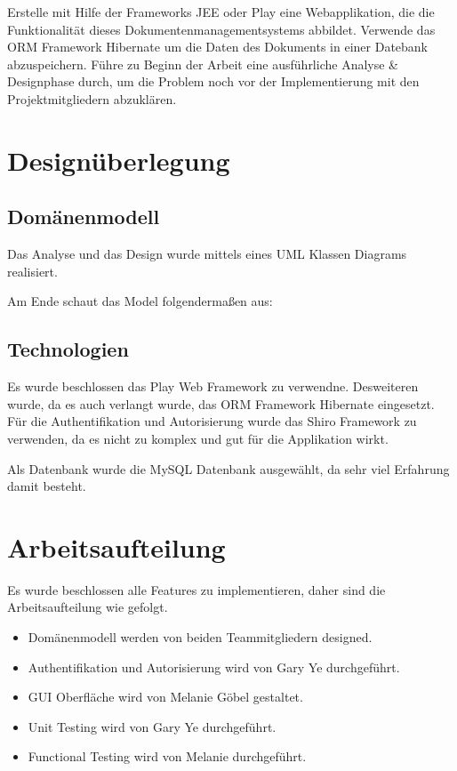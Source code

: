 \documentclass[11pt, a4paper]{article}
\begin{document}
Erstelle mit Hilfe der Frameworks JEE oder Play eine Webapplikation, die die Funktionalität dieses Dokumentenmanagementsystems abbildet. Verwende das ORM Framework Hibernate um die Daten des Dokuments in einer Datebank abzuspeichern. Führe zu Beginn der Arbeit eine ausführliche Analyse \& Designphase durch, um die Problem noch vor der Implementierung mit den Projektmitgliedern abzuklären.

\section{Designüberlegung}


\subsection{Domänenmodell}
Das Analyse und das Design wurde mittels eines UML Klassen Diagrams realisiert.



Am Ende schaut das Model folgendermaßen aus:

\subsection{Technologien}

Es wurde beschlossen das Play Web Framework zu verwendne. Desweiteren wurde, da es auch verlangt wurde, das ORM Framework Hibernate eingesetzt. Für die Authentifikation und Autorisierung wurde das Shiro Framework zu verwenden, da es nicht zu komplex und gut für die Applikation wirkt. 

Als Datenbank wurde die MySQL Datenbank ausgewählt, da sehr viel Erfahrung damit besteht.

\section{Arbeitsaufteilung}

Es wurde beschlossen alle Features zu implementieren, daher sind die Arbeitsaufteilung wie gefolgt. 

\begin{itemize}
  \item Domänenmodell werden von beiden Teammitgliedern designed.
  \item Authentifikation und Autorisierung wird von Gary Ye durchgeführt.
  \item GUI Oberfläche wird von Melanie Göbel gestaltet.
  \item Unit Testing wird von Gary Ye durchgeführt.
  \item Functional Testing wird von Melanie durchgeführt.
\end{itemize}
\end{document}

